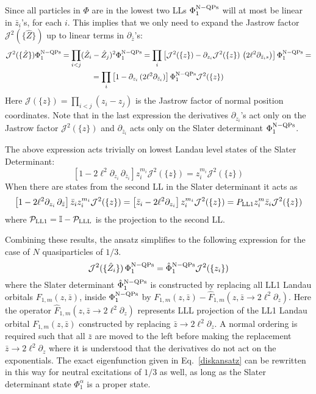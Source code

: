 \documentclass[prb,aps,epsfig,longbibliography,twocolumn]{revtex4-1}
\newcommand{\rbkt}[1]{\left( #1\right)}
\newcommand{\sbkt}[1]{\left[ #1\right]}
\begin{document}
Since all particles in $\Phi$ are in the lowest two LLs $\Phi^{\rm N-QPs}_{1}$ will at most be linear in $\bar{z}_i$'s, for each $i$. 
%
This implies that we only need to expand the Jastrow factor $\mathcal{J}^{2}(\{ \hat{Z}\})$ up to linear terms in $\partial_{\bar{z}}$'s:
\begin{multline}
\mathcal{J}^{2}(\{ \hat{Z} \})\Phi^{\rm N-QPs}_{1}=\prod_{i<j} (\hat{Z}_i - \hat{Z}_j)^{2}\Phi^{\rm N-QPs}_{1}
=\prod_{i}\sbkt{\mathcal{J}^2(\{z\}) - \partial_{z_i} \mathcal{J}^2(\{z\})\,\rbkt{2\ell^2\partial_{\bar{z}_is}}}\Phi^{\rm N-QPs}_{1}=\\
=\prod_{i}\sbkt{ 1 - \partial_{z_i} \,(2\ell^2\partial_{\bar{z}_i})}\Phi^{\rm N-QPs}_{1}\mathcal{J}^2(\{z\})
\end{multline}
Here $\mathcal{J}(\{z\})=\prod_{i<j} (z_i - z_j)$ is the Jastrow factor of normal position coordinates. Note that in the last expression the derivatives $\partial_{z_i} $'s  act only on the Jastrow factor $\mathcal{J}^2(\{z\})$ and $\partial_{\bar{z}_i}$ acts only on the Slater determinant $\Phi^{\rm N-QPs}_{1}$.

The above expression acts trivially on lowest Landau level states of the Slater Determinant:
\begin{equation}
\sbkt{ 1 - 2\ell^2  \partial_{z_i} \,\partial_{\bar{z}_i}}  z_i^{m_i}\mathcal{J}^2(\{z\})  = z_i^{m_i}\mathcal{J}^2(\{z\})
\end{equation}
When there are states from the second LL in the Slater determinant it acts as
\begin{equation}
\sbkt{ 1 - 2\ell^2  \partial_{z_i} \,\partial_{\bar{z}}}  \bar{z}_i z_i^{m_i}\mathcal{J}^2(\{z\})  =  \sbkt{ \bar{z}_i - 2\ell^2  \partial_{{z}_i}} z_i^{m_i}  \mathcal{J}^2(\{z\}) = P_{\rm LL1} z_i^m \bar{z}_i\mathcal{J}^2(\{z\})
\end{equation}
where $\mathcal{P}_{\rm LL1}=\mathbb{I}-\mathcal{P}_{\rm LLL}$ is the projection to the second LL.

Combining these results, the ansatz simplifies to the following expression for the case of $N$ quasiparticles of $1/3$.
\begin{equation}
 \mathcal{J}^{2}(\{ \hat{Z}_i \})\,\Phi^{\rm N-QPs}_{1} = \hat{\Phi}^{\rm N-QPs}_{1} \mathcal{J}^{2}(\{ z_i \})
\end{equation}
where the Slater determinant $\hat{\Phi}^{\rm N-QPs}_{1}$ is constructed by replacing all LL1 Landau orbitals $F_{1,m}(z,\bar{z})$, inside $\Phi^{\rm N-QPs}_{1}$ by $F_{1,m}(z,\bar{z})- \hat{F}_{1,m}(z,\bar{z}\rightarrow 2\ell^2 \partial_z)$.  Here the operator $\hat{F}_{1,m}(z,\bar{z}\rightarrow 2\ell^2 \partial_z)$ represents LLL projection of the LL1 Landau orbital $F_{1,m}(z,\bar{z})$ constructed by replacing $\bar{z}\rightarrow 2\ell^2 \partial_z$. A normal ordering is required  such that all $\bar{z}$ are moved to the left before making the replacement $\bar{z}\rightarrow 2\ell^2 \partial_z$ where it is understood that the derivatives do not act on the exponentials.\cite{Jain07} The exact eigenfunction given in Eq.~\eqref{diskansatz} can be rewritten in this way for neutral excitations of $1/3$ as well, as long as the Slater determinant state $\Phi^{\alpha}_{1}$ is a proper state.
\end{document}
